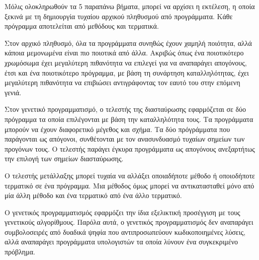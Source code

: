 Μόλις ολοκληρωθούν τα 5 παραπάνω βήματα, μπορεί να αρχίσει η εκτέλεση, η οποία ξεκινά με τη δημιουργία τυχαίου αρχικού πληθυσμού από προγράμματα. Κάθε πρόγραμμα αποτελείται από μεθόδους και τερματικά.

Στον αρχικό πληθυσμό, όλα τα προγράμματα συνηθώς έχουν χαμηλή ποιότητα, αλλά κάποια μεμονωμένα είναι πιο ποιοτικά από άλλα. Ακριβώς όπως ένα ποιοτικότερο χρωμόσωμα έχει μεγαλύτερη πιθανότητα να επιλεγεί για να αναπαράγει απογόνους, έτσι και ένα ποιοτικότερο πρόγραμμα, με βάση τη συνάρτηση καταλληλότητας, έχει μεγαλύτερη πιθανότητα να επιβιώσει αντιγράφοντας τον εαυτό του στην επόμενη γενιά.

Στον γενετικό προγραμματισμό, ο τελεστής της διασταύρωσης εφαρμόζεται σε δύο πρόγραμμα τα οποία επιλέγονται με βάση την καταλληλότητα τους. Τα προγράμματα μπορούν να έχουν διαφορετικό μέγεθος και σχήμα. Τα δύο πρόγράμματα που παράγονται ως απόγονοι, συνθέτονται με τον ανασυνδυασμό τυχαίων σημείων των προγόνων τους. Ο τελεστής παράγει έγκυρα προγράμματα ως απογόνους ανεξαρτήτως την επιλογή των σημείων διασταύρωσης.

Ο τελεστής μετάλλαξης μπορεί τυχαία να αλλάξει οποιαδήποτε μέθοδο ή οποιοδήποτε τερματικό σε ένα πρόγραμμα. Μια μέθοδος όμως μπορεί να αντικατασταθεί μόνο από μία άλλη μέθοδο και ένα τερματικό από ένα άλλο τερματικό.

Ο γενετικός προγραμματισμός εφαρμόζει την ίδια εξελικτική προσέγγιση με τους γενετικούς αλγορίθμους. Παρόλα αυτά, ο γενετικός προγραμματισμός δεν αναπαράγει συμβολοσειρές από δυαδικά ψηφία που αντιπροσωπεύουν κωδικοποιημένες λύσεις, αλλά αναπαράγει προγράμματα υπολογιστών τα οποία λύνουν ένα συγκεκριμένο πρόβλημα.







